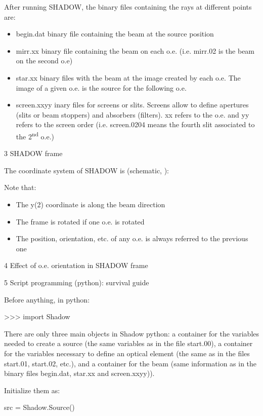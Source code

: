 \documentclass[]{article}
\providecommand{\tightlist}{%
  \setlength{\itemsep}{0pt}\setlength{\parskip}{0pt}}
\begin{document}
After running SHADOW, the binary files containing the rays at different
points are:

\begin{itemize}
\tightlist
\item
  begin.dat binary file containing the beam at the source position
\item
  mirr.xx binary file containing the beam on each o.e. (i.e. mirr.02 is
  the beam on the second o.e)
\item
  star.xx binary files with the beam at the image created by each o.e.
  The image of a given o.e. is the source for the following o.e.
\item
  screen.xxyy inary files for screens or slits. Screens allow to define
  apertures (slits or beam stoppers) and absorbers (filters). xx refers
  to the o.e. and yy refers to the screen order (i.e. screen.0204 means
  the fourth slit associated to the 2\textsuperscript{nd} o.e.)
\end{itemize}

3 SHADOW frame

The coordinate system of SHADOW is (schematic, ):

Note that:

\begin{itemize}
\tightlist
\item
  The y(2) coordinate is along the beam direction
\item
  The frame is rotated if one o.e. is rotated
\item
  The position, orientation, etc. of any o.e. is always referred to the
  previous one
\end{itemize}

4 Effect of o.e. orientation in SHADOW frame

5 Script programming (python): survival guide

Before anything, in python:

\textgreater{}\textgreater{}\textgreater{} import Shadow

There are only three main objects in Shadow python: a container for the
variables needed to create a source (the same variables as in the file
start.00), a container for the variables necessary to define an optical
element (the same as in the files start.01, start.02, etc.), and a
container for the beam (same information as in the binary files
begin.dat, star.xx and screen.xxyy)).

Initialize them as:

src = Shadow.Source()
\end{document}
